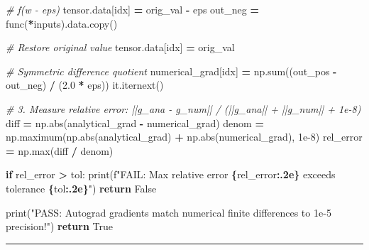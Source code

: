 \documentclass[
  letterpaper,
]{scrbook}
\newenvironment{Shaded}{\begin{snugshade}}{\end{snugshade}}
\newcommand{\BuiltInTok}[1]{#1}
\newcommand{\CommentTok}[1]{\textcolor[rgb]{0.56,0.35,0.01}{\textit{#1}}}
\newcommand{\ControlFlowTok}[1]{\textcolor[rgb]{0.13,0.29,0.53}{\textbf{#1}}}
\newcommand{\FloatTok}[1]{\textcolor[rgb]{0.00,0.00,0.81}{#1}}
\newcommand{\NormalTok}[1]{#1}
\newcommand{\OperatorTok}[1]{\textcolor[rgb]{0.81,0.36,0.00}{\textbf{#1}}}
\newcommand{\SpecialCharTok}[1]{\textcolor[rgb]{0.81,0.36,0.00}{\textbf{#1}}}
\newcommand{\SpecialStringTok}[1]{\textcolor[rgb]{0.31,0.60,0.02}{#1}}
\newcommand{\StringTok}[1]{\textcolor[rgb]{0.31,0.60,0.02}{#1}}
\newcommand{\VariableTok}[1]{\textcolor[rgb]{0.00,0.00,0.00}{#1}}
\begin{document}
\begin{Shaded}
\begin{Highlighting}[]
            \CommentTok{\# f(w {-} eps)}
\NormalTok{            tensor.data[idx] }\OperatorTok{=}\NormalTok{ orig\_val }\OperatorTok{{-}}\NormalTok{ eps}
\NormalTok{            out\_neg }\OperatorTok{=}\NormalTok{ func(}\OperatorTok{*}\NormalTok{inputs).data.copy()}

            \CommentTok{\# Restore original value}
\NormalTok{            tensor.data[idx] }\OperatorTok{=}\NormalTok{ orig\_val}

            \CommentTok{\# Symmetric difference quotient}
\NormalTok{            numerical\_grad[idx] }\OperatorTok{=}\NormalTok{ np.}\BuiltInTok{sum}\NormalTok{((out\_pos }\OperatorTok{{-}}\NormalTok{ out\_neg) }\OperatorTok{/}\NormalTok{ (}\FloatTok{2.0} \OperatorTok{*}\NormalTok{ eps))}
\NormalTok{            it.iternext()}

        \CommentTok{\# 3. Measure relative error: ||g\_ana {-} g\_num|| / (||g\_ana|| + ||g\_num|| + 1e{-}8)}
\NormalTok{        diff }\OperatorTok{=}\NormalTok{ np.}\BuiltInTok{abs}\NormalTok{(analytical\_grad }\OperatorTok{{-}}\NormalTok{ numerical\_grad)}
\NormalTok{        denom }\OperatorTok{=}\NormalTok{ np.maximum(np.}\BuiltInTok{abs}\NormalTok{(analytical\_grad) }\OperatorTok{+}\NormalTok{ np.}\BuiltInTok{abs}\NormalTok{(numerical\_grad), }\FloatTok{1e{-}8}\NormalTok{)}
\NormalTok{        rel\_error }\OperatorTok{=}\NormalTok{ np.}\BuiltInTok{max}\NormalTok{(diff }\OperatorTok{/}\NormalTok{ denom)}

        \ControlFlowTok{if}\NormalTok{ rel\_error }\OperatorTok{\textgreater{}}\NormalTok{ tol:}
            \BuiltInTok{print}\NormalTok{(}\SpecialStringTok{f"FAIL: Max relative error }\SpecialCharTok{\{}\NormalTok{rel\_error}\SpecialCharTok{:.2e\}}\SpecialStringTok{ exceeds tolerance }\SpecialCharTok{\{}\NormalTok{tol}\SpecialCharTok{:.2e\}}\SpecialStringTok{"}\NormalTok{)}
            \ControlFlowTok{return} \VariableTok{False}

    \BuiltInTok{print}\NormalTok{(}\StringTok{"PASS: Autograd gradients match numerical finite differences to 1e{-}5 precision!"}\NormalTok{)}
    \ControlFlowTok{return} \VariableTok{True}
\end{Highlighting}
\end{Shaded}

\begin{center}\rule{0.5\linewidth}{0.5pt}\end{center}
\end{document}
